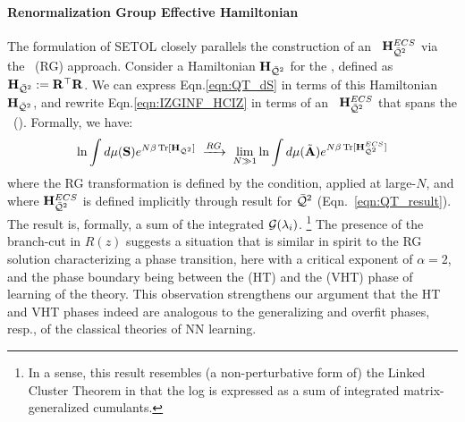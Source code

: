\paragraph{Renormalization Group Effective Hamiltonian}
The formulation of SETOL closely parallels the construction of an \EffectiveHamiltonian~$\mathbf{H}^{ECS}_{\bar{\mathcal{Q}}^{2}}$
via the \WilsonExactRenormalizationGroup~(RG) approach. Consider a \emph{\Bare} Hamiltonian $\mathbf{H}_{\bar{\mathcal{Q}}^{2}}$ for the \LayerQualitySquared,
defined as $\mathbf{H}_{\bar{\mathcal{Q}}^{2}}:= \mathbf{R}^{\top}\mathbf{R}$.
We can express Eqn.\ref{eqn:QT_dS} in terms of this \Bare Hamiltonian $\mathbf{H}_{\bar{\mathcal{Q}}^{2}}$,
and rewrite Eqn.\ref{eqn:IZGINF_HCIZ} in terms of an \emph{\Renormalized} \EffectiveHamiltonian~$\mathbf{H}^{ECS}_{\bar{\mathcal{Q}}^{2}}$
that spans the \EffectiveCorrelationSpace~(\ECS). Formally, we have:
\begin{align}
\label{eqn:RG}
\ln \int d\mu({\mathbf{S}})e^{N\beta \operatorname{Tr}[\mathbf{H}_{\bar{\mathcal{Q}}^{2}}]} \;\xrightarrow{RG}\; \lim_{N\gg 1}\ln \int d\mu(\tilde{\mathbf{A}})e^{N\beta \operatorname{Tr}[\mathbf{H}^{ECS}_{\bar{\mathcal{Q}}^{2}}]} 
\end{align}
where the RG transformation is defined by the \ScaleInvariant \TRACELOG condition,
applied at large-$N$,
and where $\mathbf{H}^{ECS}_{\bar{\mathcal{Q}}^{2}}$ is defined implicitly through result for $\bar{\mathcal{Q}}^{2}$ (Eqn.~\ref{eqn:QT_result}).
The result is, formally, a sum of the integrated \RTransforms $\mathcal{G}(\lambda_{i})$.
\footnote{In a sense, this result resembles (a non-perturbative form of) the Linked Cluster Theorem
in that the log \PartitionFunction is expressed as a sum of integrated matrix-generalized cumulants.}
 The  presence of the branch-cut in $R(z)$
suggests a situation that is similar in spirit to the RG solution
characterizing a phase transition, here with a critical exponent of $\alpha=2$,
and the phase boundary being between the \HeavyTailed 
(HT) and the \VeryHeavyTailed (VHT) phase of learning of the \HTSR theory.
This observation strengthens our argument that the \HTSR HT and VHT phases
indeed are analogous to the generalizing and overfit phases, resp.,
of the classical \SMOG theories of NN learning.


